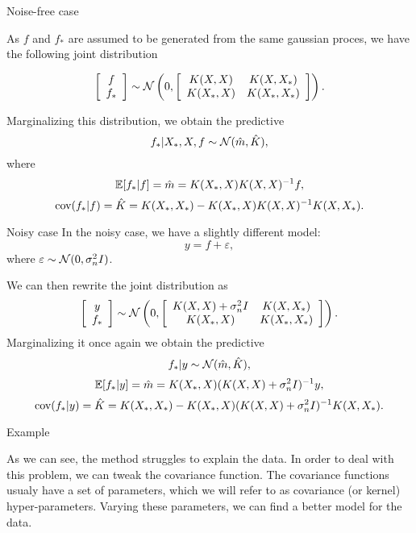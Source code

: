 		\begin{frame}{Noise-free case}

			As $f$ and $f_{*}$ are assumed to be generated from the same gaussian proces, we have the following joint distribution

			$$\left [ \begin{array}{c} f\\ f_* \end{array} \right ]
			\sim
			\mathcal{N} \left ( 0, \left [\begin{array}{cc} K(X, X) & K(X, X_*)\\ K(X_*, X) & K(X_*, X_*) \end{array} \right] \right ).
			$$

			Marginalizing this distribution, we obtain the predictive
			$$f_* | X_*, X, f \sim \mathcal{N}( \hat m, \hat K ),$$
			where 
			$$\mathbb{E} [f_* | f ] = \hat m = K(X_*, X) K(X, X)^{-1} f,$$
			$$\mbox{cov}(f_* | f ) = \hat K = K(X_*, X_*) - K(X_*, X)K(X, X)^{-1}K(X, X_*).$$

		\end{frame}

		\begin{frame}{Noisy case}
			In the noisy case, we have a slightly different model:
			$$y = f + \varepsilon,$$
			where $\varepsilon \sim \mathcal{N}(0, \sigma_n^2 I)$.

			We can then rewrite the joint distribution as
			$$\left [ \begin{array}{c} y\\ f_* \end{array} \right ]
			\sim
			\mathcal{N} \left ( 0, \left [\begin{array}{cc} K(X, X) + \sigma_n^2 I & K(X, X_*)\\ K(X_*, X) & K(X_*, X_*) \end{array} \right] \right ).
			$$
			Marginalizing it once again we obtain the predictive
			$$f_* | y \sim \mathcal{N}( \hat m, \hat K ),$$
			$$\mathbb{E}[f_* | y] = \hat m = K(X_*, X) (K(X, X) + \sigma_n^2 I)^{-1} y,$$
			$$\mbox{cov}(f_* | y ) = \hat K = K(X_*, X_*) - K(X_*, X)(K(X, X) + \sigma_n^2 I)^{-1}K(X, X_*).$$


		\end{frame}

		\begin{frame}{Example}
			\begin{figure}[!h]
				\centering
				\subfloat{
					\scalebox{0.5}{
						
					}
				}
			\end{figure}

			As we can see, the method struggles to explain the data. In order to deal with this problem, we can tweak the covariance function. The covariance functions usualy have a set of parameters, which we will refer to as covariance (or kernel) hyper-parameters. Varying these parameters, we can find a better model for the data.

		\end{frame}

